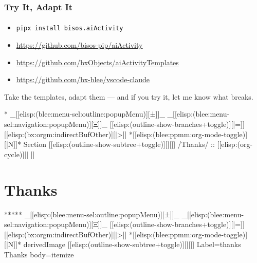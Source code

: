 \begin{whenOrg}
\begin{verblatex}

\begin{frame}[fragile,plain,label=tryIt]
    \frametitle{Try It, Adapt It}
    \framesubtitle{}

\begin{itemize}
  \item \texttt{pipx install bisos.aiActivity}
  \item \href{https://github.com/bisos-pip/aiActivity}{https://github.com/bisos-pip/aiActivity}
  \item \href{https://github.com/bxObjects/aiActivityTemplates}{https://github.com/bxObjects/aiActivityTemplates}
  \item \href{https://github.com/bx-blee/vscode-claude}{https://github.com/bx-blee/vscode-claude}
  \end{itemize}

  \vspace{0.15in}
  Take the templates, adapt them --- and if you try it, let me know what breaks.


\end{frame}
\end{verblatex}



\begin{whenOrg}
*  _[[elisp:(blee:menu-sel:outline:popupMenu)][±]]_ _[[elisp:(blee:menu-sel:navigation:popupMenu)][Ξ]]_ [[elisp:(outline-show-branches+toggle)][|=]] [[elisp:(bx:orgm:indirectBufOther)][|>]] *[[elisp:(blee:ppmm:org-mode-toggle)][|N]]*  Section    [[elisp:(outline-show-subtree+toggle)][||]]   /Thanks/ ::  [[elisp:(org-cycle)][| ]]
\end{whenOrg}

\section{Thanks}

\begin{whenOrg}
*****  _[[elisp:(blee:menu-sel:outline:popupMenu)][±]]_ _[[elisp:(blee:menu-sel:navigation:popupMenu)][Ξ]]_ [[elisp:(outline-show-branches+toggle)][|=]] [[elisp:(bx:orgm:indirectBufOther)][|>]] *[[elisp:(blee:ppmm:org-mode-toggle)][|N]]*  derivedImage [[elisp:(outline-show-subtree+toggle)][||]] Label=thanks Thanks body=itemize
\end{whenOrg}


\end{whenOrg}
